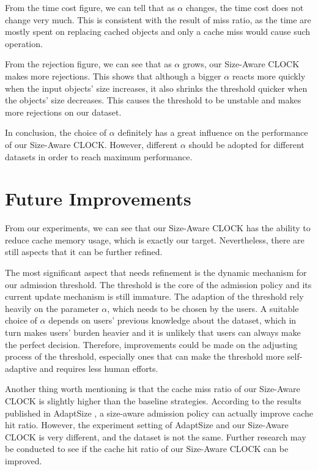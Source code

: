 \documentclass[journal,10.5pt,onecolumn]{IEEEtran}
\begin{document}
From the time cost figure, we can tell that as $\alpha$ changes, the time cost does not change very much. This is consistent with the result of miss ratio, as the time are mostly spent on replacing cached objects and only a cache miss would cause such operation.

From the rejection figure, we can see that as $\alpha$ grows, our Size-Aware CLOCK makes more rejections. This shows that although a bigger $\alpha$ reacts more quickly when the input objects' size increases, it also shrinks the threshold quicker when the objects' size decreases. This causes the threshold to be unstable and makes more rejections on our dataset.

In conclusion, the choice of $\alpha$ definitely has a great influence on the performance of our Size-Aware CLOCK. However, different $\alpha$ should be adopted for different datasets in order to reach maximum performance.


\section{Future Improvements}
From our experiments, we can see that our Size-Aware CLOCK has the ability to reduce cache memory usage, which is exactly our target. Nevertheless, there are still aspects that it can be further refined. 

The most significant aspect that needs refinement is the dynamic mechanism for our admission threshold. The threshold is the core of the admission policy and its current update mechanism is still immature. The adaption of the threshold rely heavily on the parameter $\alpha$, which needs to be chosen by the users. A suitable choice of $\alpha$ depends on users' previous knowledge about the dataset, which in turn makes users' burden heavier and it is unlikely that users can always make the perfect decision. Therefore, improvements could be made on the adjusting process of the threshold, especially ones that can make the threshold more self-adaptive and requires less human efforts.

Another thing worth mentioning is that the cache miss ratio of our Size-Aware CLOCK is slightly higher than the baseline strategies. According to the results published in AdaptSize \cite{b4}, a size-aware admission policy can actually improve cache hit ratio. However, the experiment setting of AdaptSize and our Size-Aware CLOCK is very different, and the dataset is not the same. Further research may be conducted to see if the cache hit ratio of our Size-Aware CLOCK can be improved.
\end{document}
